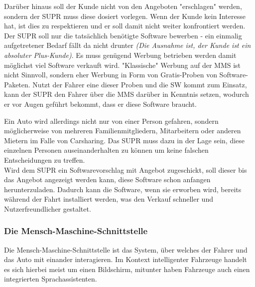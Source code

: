 Darüber hinaus soll der Kunde nicht von den Angeboten "erschlagen" werden, sondern der SUPR muss diese dosiert vorlegen. Wenn der Kunde kein Interesse hat, ist dies zu respektieren und er soll damit nicht weiter konfrontiert werden. Der SUPR soll nur die tatsächlich benötigte Software bewerben - ein einmalig aufgetretener Bedarf fällt da nicht drunter \textit{(Die Ausnahme ist, der Kunde ist ein absoluter Plus-Kunde)}. Es muss genügend Werbung betrieben werden damit möglichst viel Software verkauft wird. "Klassische" Werbung auf der MMS ist nicht Sinnvoll, sondern eher Werbung in Form von Gratis-Proben von Software-Paketen. Nutzt der Fahrer eine dieser Proben und die SW kommt zum Einsatz, kann der SUPR den Fahrer über die MMS darüber in Kenntnis setzen, wodurch er vor Augen geführt bekommt, dass er diese Software braucht.

Ein Auto wird allerdings nicht nur von einer Person gefahren, sondern möglicherweise von mehreren Familienmitgliedern, Mitarbeitern oder anderen Mietern im Falle von Carsharing. Das SUPR muss dazu in der Lage sein, diese einzelnen Personen auseinanderhalten zu können um keine falschen Entscheidungen zu treffen.\\

Wird dem SUPR ein Softwarevorschlag mit Angebot zugeschickt, soll dieser bis das Angebot angezeigt werden kann, diese Software schon anfangen herunterzuladen. Dadurch kann die Software, wenn sie erworben wird, bereits während der Fahrt installiert werden, was den Verkauf schneller und Nutzerfreundlicher gestaltet.
\subsubsection{Die Mensch-Maschine-Schnittstelle}\label{MMS}
Die Mensch-Maschine-Schnittstelle ist das System, über welches der Fahrer und das Auto mit einander interagieren. Im Kontext intelligenter Fahrzeuge handelt es sich hierbei meist um einen Bildschirm, mitunter haben Fahrzeuge auch einen integrierten Sprachassistenten.\\

